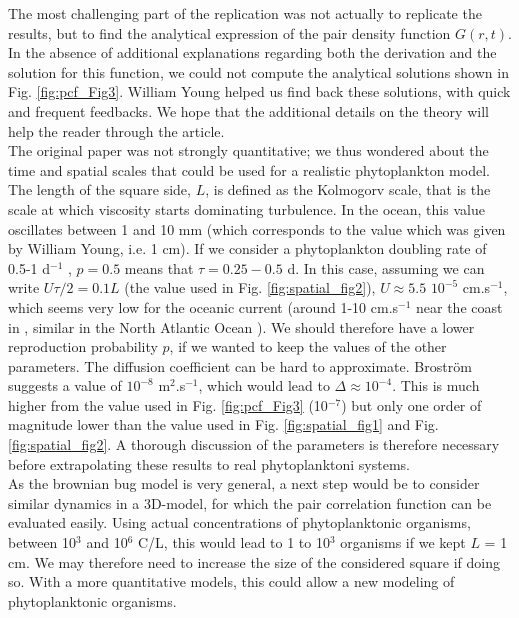 The most challenging part of the replication was not actually to replicate the results, but to find the analytical expression of the pair density function $G(r,t)$. In the absence of additional explanations regarding both the derivation and the solution for this function, we could not compute the analytical solutions shown in Fig. \ref{fig:pcf_Fig3}. William Young helped us find back these solutions, with quick and frequent feedbacks. We hope that the additional details on the theory will help the reader through the article. \\

The original paper was not strongly quantitative; we thus wondered about the time and spatial scales that could be used for a realistic phytoplankton model. The length of the square side, $L$, is defined as the Kolmogorv scale, that is the scale at which viscosity starts dominating turbulence. In the ocean, this value oscillates between 1 and 10 mm \citep{barton_impact_2014} (which corresponds to the value which was given by William Young, i.e. 1 cm). If we consider a phytoplankton doubling rate of 0.5-1 d$^{-1}$ \citep{bissinger_predicting_2008}, $p=0.5$ means that $\tau=0.25 - 0.5$ d. In this case, assuming we can write $U\tau/2=0.1L$ (the value used in Fig. \ref{fig:spatial_fig2}), $U\approx 5.5$ $10^{-5}$ cm.s$^{-1}$, which seems very low for the oceanic current (around 1-10 cm.s$^{-1}$ near the coast in \cite{font-munoz_advection_2017}, similar in the North Atlantic Ocean \citep{flatau_north_2003}). We should therefore have a lower reproduction probability $p$, if we wanted to keep the values of the other parameters. The diffusion coefficient can be hard to approximate. Brostr\"om \citep{brostrom_advection_2002} suggests a value of $10^{-8}$ m$^{2}$.s$^{-1}$, which would lead to $\Delta \approx 10^{-4}$. This is much higher from the value used in Fig. \ref{fig:pcf_Fig3} (10$^{-7}$) but only one order of magnitude lower than the value used in Fig. \ref{fig:spatial_fig1} and Fig. \ref{fig:spatial_fig2}. A thorough discussion of the parameters is therefore necessary before extrapolating these results to real phytoplanktoni systems. \\

As the brownian bug model is very general, a next step would be to consider similar dynamics in a 3D-model, for which the pair correlation function can be evaluated easily. Using actual concentrations of phytoplanktonic organisms, between 10$^3$ and 10$^6$ C/L, this would lead to 1 to 10$^3$ organisms if we kept $L$ = 1 cm. We may therefore need to increase the size of the considered square if doing so. With a more quantitative models, this could allow a new modeling of phytoplanktonic organisms. 




